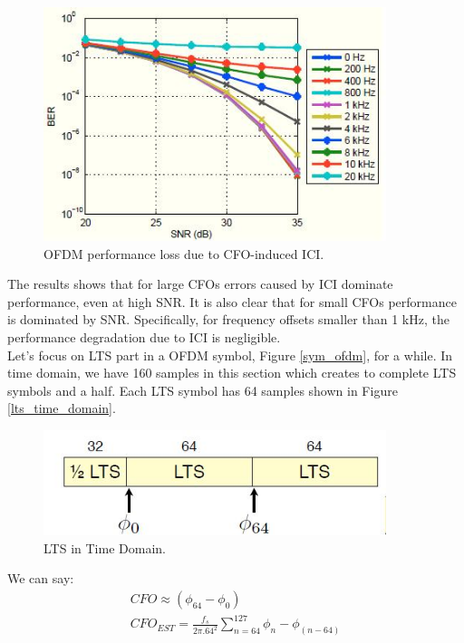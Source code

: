 \begin{figure}[h!]
\centering
\includegraphics[width=10cm]{content/fig/cfo_on_ici.JPG}
\caption{OFDM performance loss due to CFO-induced ICI.}
\label{fig:cfo_impact_on_ici}
\end{figure}

The results shows that for large CFOs errors caused by ICI dominate performance, even at high SNR. It is also
clear that for small CFOs performance is dominated by SNR. Specifically, for frequency offsets smaller than 1 kHz, the
performance degradation due to ICI is negligible.\\
Let's focus on LTS part in a OFDM symbol, Figure \ref{sym_ofdm}, for a while. In time domain, we have 160 samples in this section which creates to complete LTS symbols and a half. Each LTS symbol has 64 samples shown in Figure \ref{lts_time_domain}.\\

\begin{figure}[h!]
\centering
\includegraphics[width=10cm]{content/fig/LTS_time_domain.JPG}
\caption{LTS in Time Domain.}
\label{fig:lts_time_domain}
\end{figure}

We can say:
\begin{equation} \label{cfo_cal}
\begin{split}
CFO \approx (\phi_{64}- \phi_{0})\\
CFO_{EST} = \frac{f_{s}}{2\pi . 64^{2}} \sum\limits_{n=64}^{127} \phi_{n}- \phi_{(n-64)}\\
\end{split}
\end{equation}


